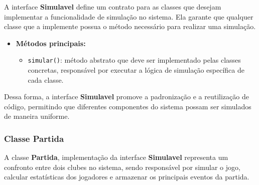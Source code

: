 \documentclass[12pt]{article}
\begin{document}
A interface \textbf{Simulavel} define um contrato para as classes que desejam implementar a funcionalidade de simulação no sistema. Ela garante que qualquer classe que a implemente possua o método necessário para realizar uma simulação.

\begin{itemize}
  \item \textbf{Métodos principais:}
        \begin{itemize}
          \item \texttt{simular()}: método abstrato que deve ser implementado pelas classes concretas, responsável por executar a lógica de simulação específica de cada classe.
        \end{itemize}
\end{itemize}

Dessa forma, a interface \textbf{Simulavel} promove a padronização e a reutilização de código, permitindo que diferentes componentes do sistema possam ser simulados de maneira uniforme.

\subsubsection{Classe Partida}

A classe \textbf{Partida}, implementação da interface \textbf{Simulavel} representa um confronto entre dois clubes no sistema, sendo responsável por simular o jogo, calcular estatísticas dos jogadores e armazenar os principais eventos da partida.
\end{document}
